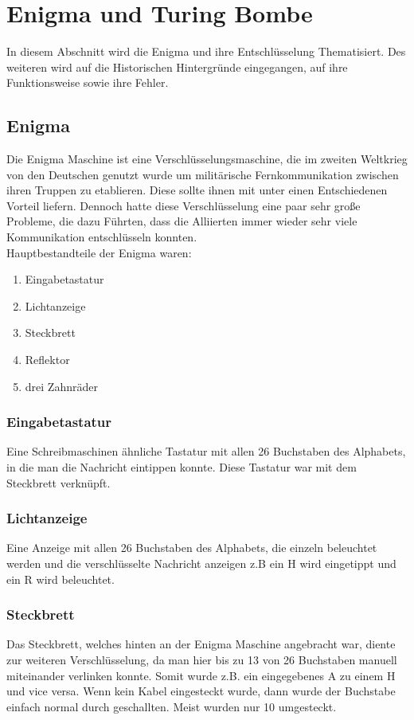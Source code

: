 \section{Enigma und Turing Bombe}
In diesem Abschnitt wird die Enigma und ihre Entschlüsselung Thematisiert. Des weiteren wird auf die Historischen Hintergründe eingegangen, auf ihre Funktionsweise sowie ihre Fehler.

\subsection{Enigma}
Die Enigma Maschine ist eine Verschlüsselungsmaschine, die im zweiten Weltkrieg von den Deutschen genutzt wurde um militärische Fernkommunikation zwischen ihren Truppen zu etablieren. Diese sollte ihnen mit unter einen Entschiedenen Vorteil liefern. Dennoch hatte diese Verschlüsselung eine paar sehr große Probleme, die dazu Führten, dass die Alliierten immer wieder sehr viele Kommunikation entschlüsseln konnten.\\
Hauptbestandteile der Enigma waren:
\begin{enumerate}
\item Eingabetastatur
\item Lichtanzeige
\item Steckbrett
\item Reflektor
\item drei Zahnräder
\end{enumerate}

\subsubsection{Eingabetastatur}
Eine Schreibmaschinen ähnliche Tastatur mit allen 26 Buchstaben des Alphabets, in die man die Nachricht eintippen konnte. Diese Tastatur war mit dem Steckbrett verknüpft.

\subsubsection{Lichtanzeige}
Eine Anzeige mit allen 26 Buchstaben des Alphabets, die einzeln beleuchtet werden und die verschlüsselte Nachricht anzeigen z.B ein H wird eingetippt und ein R wird beleuchtet.

\subsubsection{Steckbrett}
\label{sec:steck}
Das Steckbrett, welches hinten an der Enigma Maschine angebracht war, diente zur weiteren Verschlüsselung, da man hier bis zu 13 von 26 Buchstaben manuell miteinander verlinken konnte. Somit wurde z.B. ein eingegebenes A zu einem H und vice versa. Wenn kein Kabel eingesteckt wurde, dann wurde der Buchstabe einfach normal durch geschallten. Meist wurden nur 10 umgesteckt.

